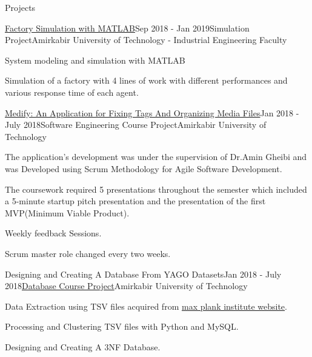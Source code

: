 \documentclass{resume} %
\begin{document}
	\begin{rSection}{Projects}
		
		\begin{rSubsection}{\href{https://github.com/pouyaaghahoseini/System-Queueing-Simulation}{Factory Simulation with MATLAB}}{Sep 2018 - Jan 2019}{Simulation  Project}{Amirkabir University of Technology - Industrial Engineering Faculty}
			\item System modeling and simulation with MATLAB
			\item Simulation of a factory with 4 lines of work with different performances and various response time of each agent.
			
			
		\end{rSubsection}
	
		\begin{rSubsection}{\href{https://github.com/pouyaaghahoseini/Medify}{Medify: An Application for Fixing Tags And Organizing Media Files}}{Jan 2018 - July 2018}{Software Engineering Course Project}{Amirkabir University of Technology}
			
			\item The application's development was under the supervision of Dr.Amin Gheibi and was Developed using Scrum Methodology for Agile Software Development.
			\item The coursework required 5 presentations throughout the semester which included a 5-minute startup pitch presentation and the presentation of the first MVP(Minimum Viable Product).
			\item Weekly feedback Sessions.
			\item Scrum master role changed every two weeks.	
		\end{rSubsection}
		
		\begin{rSubsection}{Designing and Creating A Database From YAGO Datasets}{Jan 2018 - July 2018}{\href{https://github.com/pouyaaghahoseini/Database-Course}{Database Course Project}}{Amirkabir University of Technology}
			\item Data Extraction using TSV files acquired from \href{https://www.mpi-inf.mpg.de/departments/databases-and-information-systems/research/yago-naga/yago/downloads/}{max plank institute website}.
			\item Processing and Clustering TSV files with Python and MySQL.
			\item Designing and Creating A 3NF Database.
			
		\end{rSubsection}	
		

\end{rSection}
\end{document}
